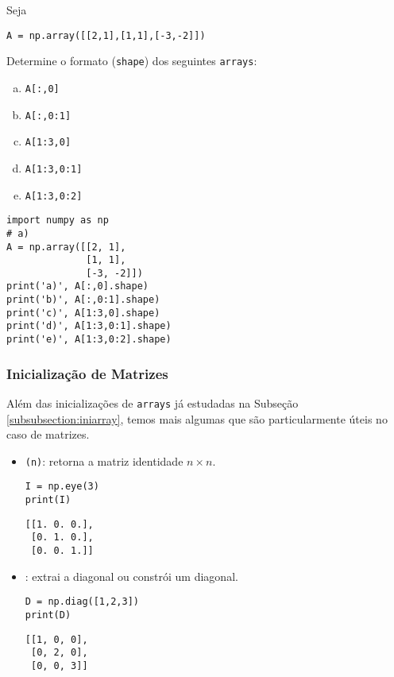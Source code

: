 \begin{exer}
  Seja

\begin{lstlisting}
A = np.array([[2,1],[1,1],[-3,-2]])
\end{lstlisting}

  Determine o formato (\texttt{shape}) dos seguintes \texttt{arrays}:
  \begin{enumerate}[a)]
  \item \texttt{A[:,0]}
  \item \texttt{A[:,0:1]}
  \item \texttt{A[1:3,0]}
  \item \texttt{A[1:3,0:1]}
  \item \texttt{A[1:3,0:2]}
  \end{enumerate}
\end{exer}
\begin{resp}
  
\begin{lstlisting}
import numpy as np
# a)
A = np.array([[2, 1],
              [1, 1],
              [-3, -2]])
print('a)', A[:,0].shape)
print('b)', A[:,0:1].shape)
print('c)', A[1:3,0].shape)
print('d)', A[1:3,0:1].shape)
print('e)', A[1:3,0:2].shape)
\end{lstlisting}

\end{resp}

\subsubsection{Inicialização de Matrizes}

Além das inicializações de \texttt{arrays} já estudadas na Subseção \ref{subsubsection:iniarray}, temos mais algumas que são particularmente úteis no caso de matrizes.
\begin{itemize}
  \item \hl{\PYTHONnumpyDOTeye}\texttt{(n)}: retorna a matriz identidade $n\times n$.

\begin{lstlisting}[framexrightmargin=-2.4em]
I = np.eye(3)
print(I)
\end{lstlisting}

\begin{verbatim}
[[1. 0. 0.],
 [0. 1. 0.],
 [0. 0. 1.]]
\end{verbatim}

  \item \hl{\PYTHONnumpyDOTdiag}: extrai a diagonal ou constrói um {\PYTHONnumpyDOTarray} diagonal.

\begin{lstlisting}[framexrightmargin=-2.4em]
D = np.diag([1,2,3])
print(D)
\end{lstlisting}

\begin{verbatim}
[[1, 0, 0],
 [0, 2, 0],
 [0, 0, 3]]
\end{verbatim}

\end{itemize}

